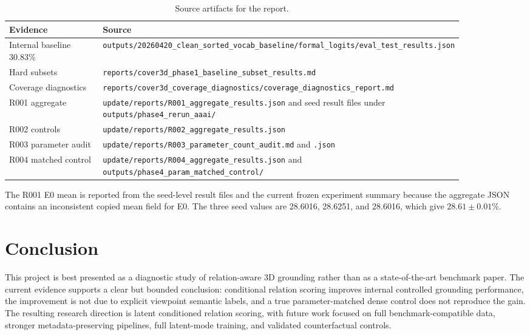 \documentclass[11pt]{article}
\begin{document}
\begin{table}[t]
\centering
\small
\caption{Source artifacts for the report.}
\label{tab:sources}
\begin{tabular}{p{0.25\linewidth}p{0.62\linewidth}}
\toprule
Evidence & Source \\
\midrule
Internal baseline 30.83\% & \texttt{outputs/20260420\_clean\_sorted\_vocab\_baseline/formal\_logits/eval\_test\_results.json} \\
Hard subsets & \texttt{reports/cover3d\_phase1\_baseline\_subset\_results.md} \\
Coverage diagnostics & \texttt{reports/cover3d\_coverage\_diagnostics/coverage\_diagnostics\_report.md} \\
R001 aggregate & \texttt{update/reports/R001\_aggregate\_results.json} and seed result files under \texttt{outputs/phase4\_rerun\_aaai/} \\
R002 controls & \texttt{update/reports/R002\_aggregate\_results.json} \\
R003 parameter audit & \texttt{update/reports/R003\_parameter\_count\_audit.md} and \texttt{.json} \\
R004 matched control & \texttt{update/reports/R004\_aggregate\_results.json} and \texttt{outputs/phase4\_param\_matched\_control/} \\
\bottomrule
\end{tabular}
\end{table}

The R001 E0 mean is reported from the seed-level result files and the current frozen experiment summary because the aggregate JSON contains an inconsistent copied mean field for E0. The three seed values are 28.6016, 28.6251, and 28.6016, which give $28.61\pm0.01$\%.

\section{Conclusion}

This project is best presented as a diagnostic study of relation-aware 3D grounding rather than as a state-of-the-art benchmark paper. The current evidence supports a clear but bounded conclusion: conditional relation scoring improves internal controlled grounding performance, the improvement is not due to explicit viewpoint semantic labels, and a true parameter-matched dense control does not reproduce the gain. The resulting research direction is latent conditioned relation scoring, with future work focused on full benchmark-compatible data, stronger metadata-preserving pipelines, full latent-mode training, and validated counterfactual controls.
\end{document}
